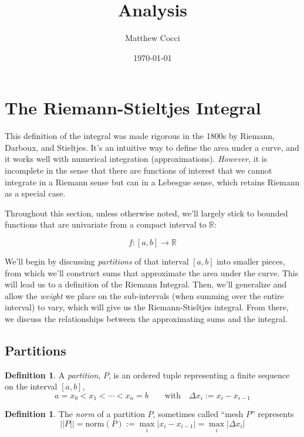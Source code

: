 \documentclass[12pt]{article}
\author{Matthew Cocci}
\title{\textbf{Analysis}}
\date{\today}
\theoremstyle{plain}
\theoremstyle{definition}
\newtheorem{defn}[thm]{Definition}
\theoremstyle{remark}
\begin{document}
\maketitle

\tableofcontents %

\newpage
\section{The Riemann-Stieltjes Integral}

This definition of the integral was made rigorous in the 1800s by Riemann, Darboux, and Stieltjes.  It's an intuitive way to define the area under a curve, and it works well with numerical integration (approximations). \emph{However}, it is incomplete in the sense that there are functions of interest that we cannot integrate in a Riemann sense but can in a Lebesgue sense, which retains Riemann as a special case.

Throughout this section, unless otherwise noted, we'll largely stick to bounded functions that are univariate from a compact interval to $\mathbb{R}$: 

    \[ f: [a, b] \rightarrow \mathbb{R} \]

    We'll begin by discussing \emph{partitions} of that interval $[a,b]$ into smaller pieces, from which we'll construct sums that approximate the area under the curve.  This will lead us to a definition of the Riemann Integral.  Then, we'll generalize and allow the \emph{weight} we place on the sub-intervals (when summing over the entire interval) to vary, which will give us the Riemann-Stieltjes integral. From there, we discuss the relationships between the approximating sums and the integral.

\subsection{Partitions}

\begin{defn} A \emph{partition}, $P$, is an ordered tuple representing a finite sequence on the interval $[a,b]$,
    \[ a = x_0 < x_1 < \cdots < x_n = b
        \qquad \text{with} \quad \Delta x_i := x_i - x_{i-1}
    \]
\end{defn}

\begin{defn} The \emph{norm} of a partition $P$, sometimes called ``mesh $P$'' represents
    \[ || P || = \text{norm}(P) := \max_i |x_i - x_{i-1}| =
        \max_i |\Delta x_i| \] 
\end{defn}
\end{document}
